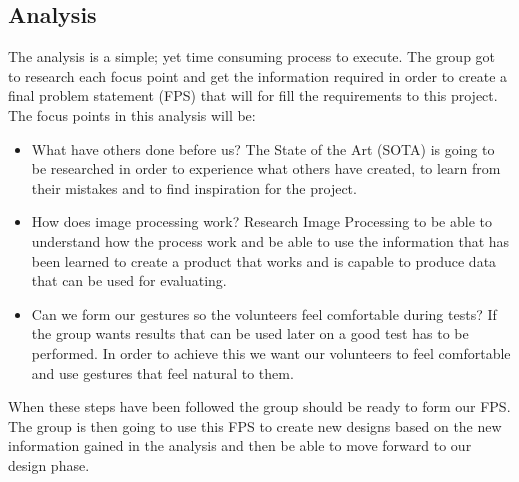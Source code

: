 \subsection{Analysis}
The analysis is a simple; yet time consuming process to execute. The group got to research each focus point and get the information required in order to create a final problem statement (FPS) that will for fill the requirements to this project. The focus points in this analysis will be:

\begin{itemize}
\item What have others done before us? \newline
The State of the Art (SOTA) is going to be researched in order to experience what others have created, to learn from their mistakes and to find inspiration for the project. 

\item How does image processing work? \newline
Research Image Processing to be able to understand how the process work and be able to use the information that has been learned to create a product that works and is capable to produce data that can be used for evaluating.

\item Can we form our gestures so the volunteers feel comfortable during tests? \newline
If the group wants results that can be used later on a good test has to be performed. In order to achieve this we want our volunteers to feel comfortable and use gestures that feel natural to them. 
\end{itemize} 

\pagebreak[1]
When these steps have been followed the group should be ready to form our FPS. The group is then going to use this FPS to create new designs based on the new information gained in the analysis and then be able to move forward to our design phase. 
